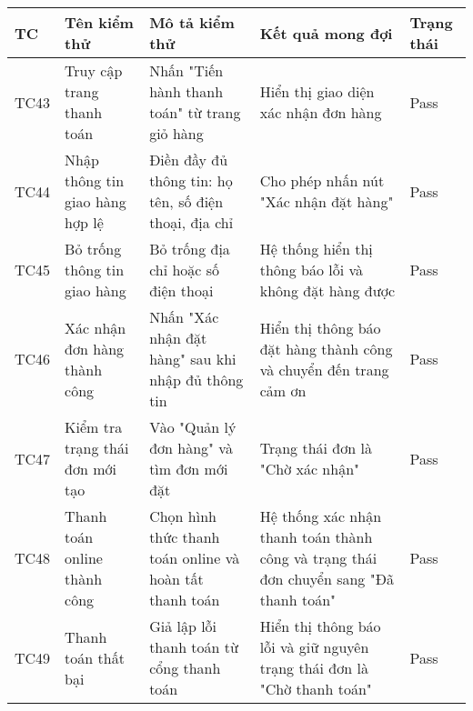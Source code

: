 \begin{longtable}{|p{1cm}|p{3cm}|p{4cm}|p{3cm}|p{2cm}|}
\hline
\textbf{TC} & \textbf{Tên kiểm thử} & \textbf{Mô tả kiểm thử} & \textbf{Kết quả mong đợi} & \textbf{Trạng thái} \\
\hline
TC43 & Truy cập trang thanh toán & Nhấn "Tiến hành thanh toán" từ trang giỏ hàng & Hiển thị giao diện xác nhận đơn hàng & Pass \\
\hline
TC44 & Nhập thông tin giao hàng hợp lệ & Điền đầy đủ thông tin: họ tên, số điện thoại, địa chỉ & Cho phép nhấn nút "Xác nhận đặt hàng" & Pass \\
\hline
TC45 & Bỏ trống thông tin giao hàng & Bỏ trống địa chỉ hoặc số điện thoại & Hệ thống hiển thị thông báo lỗi và không đặt hàng được & Pass \\
\hline
TC46 & Xác nhận đơn hàng thành công & Nhấn "Xác nhận đặt hàng" sau khi nhập đủ thông tin & Hiển thị thông báo đặt hàng thành công và chuyển đến trang cảm ơn & Pass \\
\hline
TC47 & Kiểm tra trạng thái đơn mới tạo & Vào "Quản lý đơn hàng" và tìm đơn mới đặt & Trạng thái đơn là "Chờ xác nhận" & Pass \\
\hline
TC48 & Thanh toán online thành công & Chọn hình thức thanh toán online và hoàn tất thanh toán & Hệ thống xác nhận thanh toán thành công và trạng thái đơn chuyển sang "Đã thanh toán" & Pass \\
\hline
TC49 & Thanh toán thất bại & Giả lập lỗi thanh toán từ cổng thanh toán & Hiển thị thông báo lỗi và giữ nguyên trạng thái đơn là "Chờ thanh toán" & Pass \\
\hline
\end{longtable}
